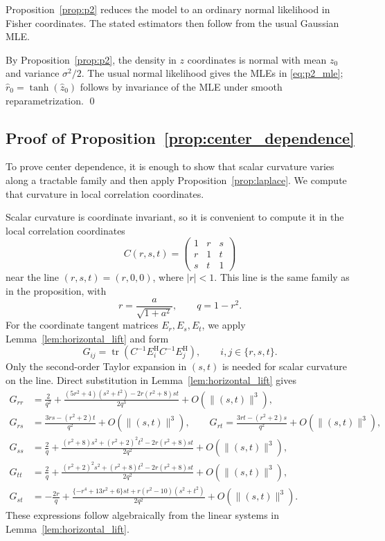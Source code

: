 \documentclass[
  12pt]{article}
\newcommand{\tr}{\operatorname{tr}}
\begin{document}
Proposition~\ref{prop:p2} reduces the model to an ordinary normal likelihood in Fisher coordinates. The stated estimators then follow from the usual Gaussian MLE.

By Proposition~\ref{prop:p2}, the density in $z$ coordinates is normal with mean $z_0$ and variance $\sigma^2/2$. The usual normal likelihood gives the MLEs in \eqref{eq:p2_mle}; $\widehat r_0=\tanh(\widehat z_0)$ follows by invariance of the MLE under smooth reparametrization. \qed




\subsection{Proof of Proposition~\ref{prop:center_dependence}}

To prove center dependence, it is enough to show that scalar curvature varies along a tractable family and then apply Proposition~\ref{prop:laplace}. We compute that curvature in local correlation coordinates.

Scalar curvature is coordinate invariant, so it is convenient to compute it in the local correlation coordinates
\[
C(r,s,t)=\begin{pmatrix}1&r&s\\ r&1&t\\ s&t&1\end{pmatrix}
\]
near the line $(r,s,t)=(r,0,0)$, where $|r|<1$. This line is the same family as in the proposition, with
\[
r=\frac{a}{\sqrt{1+a^2}},\qquad q=1-r^2.
\]
For the coordinate tangent matrices $E_r,E_s,E_t$, we apply Lemma~\ref{lem:horizontal_lift} and form
\[
G_{ij}=\tr(C^{-1}E_i^{\mathrm H}C^{-1}E_j^{\mathrm H}),\qquad i,j\in\{r,s,t\}.
\]
Only the second-order Taylor expansion in $(s,t)$ is needed for scalar curvature on the line. Direct substitution in Lemma~\ref{lem:horizontal_lift} gives
\begin{align*}
G_{rr}&=\frac{2}{q^2}+\frac{(5r^2+4)(s^2+t^2)-2r(r^2+8)st}{2q^3}+O(\|(s,t)\|^3),\\
G_{rs}&=\frac{3rs-(r^2+2)t}{q^2}+O(\|(s,t)\|^3),\qquad
G_{rt}=\frac{3rt-(r^2+2)s}{q^2}+O(\|(s,t)\|^3),\\
G_{ss}&=\frac{2}{q}+\frac{(r^2+8)s^2+(r^2+2)^2t^2-2r(r^2+8)st}{2q^2}+O(\|(s,t)\|^3),\\
G_{tt}&=\frac{2}{q}+\frac{(r^2+2)^2s^2+(r^2+8)t^2-2r(r^2+8)st}{2q^2}+O(\|(s,t)\|^3),\\
G_{st}&=-\frac{2r}{q}+\frac{\{-r^4+13r^2+6\}st+r(r^2-10)(s^2+t^2)}{2q^2}+O(\|(s,t)\|^3).
\end{align*}
These expressions follow algebraically from the linear systems in Lemma~\ref{lem:horizontal_lift}.
\end{document}
